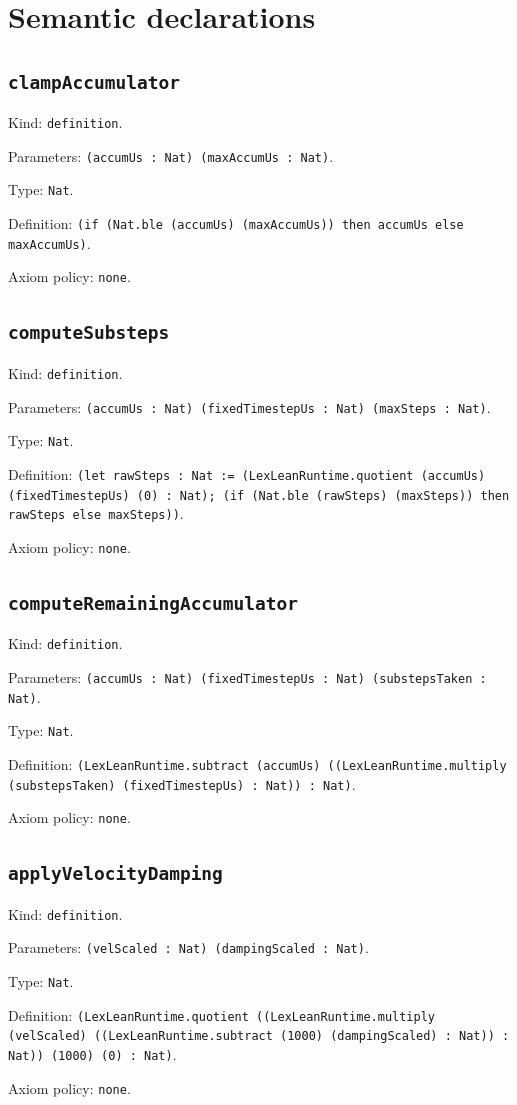 \documentclass[11pt]{article}
\begin{document}
\section*{Semantic declarations}
\subsection*{\texttt{clampAccumulator}}
\noindent Kind: \texttt{definition}.\par
\noindent Parameters: \texttt{(accumUs : Nat) (maxAccumUs : Nat)}.\par
\noindent Type: \texttt{Nat}.\par
\noindent Definition: \texttt{(if (Nat.ble (accumUs) (maxAccumUs)) then accumUs else maxAccumUs)}.\par
\noindent Axiom policy: \texttt{none}.\par
\subsection*{\texttt{computeSubsteps}}
\noindent Kind: \texttt{definition}.\par
\noindent Parameters: \texttt{(accumUs : Nat) (fixedTimestepUs : Nat) (maxSteps : Nat)}.\par
\noindent Type: \texttt{Nat}.\par
\noindent Definition: \texttt{(let rawSteps : Nat := (LexLeanRuntime.quotient (accumUs) (fixedTimestepUs) (0) : Nat); (if (Nat.ble (rawSteps) (maxSteps)) then rawSteps else maxSteps))}.\par
\noindent Axiom policy: \texttt{none}.\par
\subsection*{\texttt{computeRemainingAccumulator}}
\noindent Kind: \texttt{definition}.\par
\noindent Parameters: \texttt{(accumUs : Nat) (fixedTimestepUs : Nat) (substepsTaken : Nat)}.\par
\noindent Type: \texttt{Nat}.\par
\noindent Definition: \texttt{(LexLeanRuntime.subtract (accumUs) ((LexLeanRuntime.multiply (substepsTaken) (fixedTimestepUs) : Nat)) : Nat)}.\par
\noindent Axiom policy: \texttt{none}.\par
\subsection*{\texttt{applyVelocityDamping}}
\noindent Kind: \texttt{definition}.\par
\noindent Parameters: \texttt{(velScaled : Nat) (dampingScaled : Nat)}.\par
\noindent Type: \texttt{Nat}.\par
\noindent Definition: \texttt{(LexLeanRuntime.quotient ((LexLeanRuntime.multiply (velScaled) ((LexLeanRuntime.subtract (1000) (dampingScaled) : Nat)) : Nat)) (1000) (0) : Nat)}.\par
\noindent Axiom policy: \texttt{none}.\par
\end{document}
